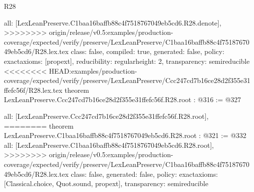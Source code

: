 \begin{lexlean}{R28}
\begin{coremodule}
{{{{{  all: [LexLeanPreserve.C1baa16baffb88c4f7518767049eb5cd6.R28.denote],
>>>>>>>> origin/release/v0.5:examples/production-coverage/expected/verify/preserve/LexLeanPreserve/C1baa16baffb88c4f7518767049eb5cd6/R28.lex.tex
  class: false,
  compiled: true,
  generated: false,
  policy: exact{axioms: [propext]},
  reducibility: regular{height: 2},
  transparency: semireducible
}
<<<<<<<< HEAD:examples/production-coverage/expected/verify/preserve/LexLeanPreserve/Ccc247cd7b16ce28d2f355e31ffefc56f/R28.lex.tex
theorem LexLeanPreserve.Ccc247cd7b16ce28d2f355e31ffefc56f.R28.root : @316 := @327 {
  all: [LexLeanPreserve.Ccc247cd7b16ce28d2f355e31ffefc56f.R28.root],
========
theorem LexLeanPreserve.C1baa16baffb88c4f7518767049eb5cd6.R28.root : @321 := @332 {
  all: [LexLeanPreserve.C1baa16baffb88c4f7518767049eb5cd6.R28.root],
>>>>>>>> origin/release/v0.5:examples/production-coverage/expected/verify/preserve/LexLeanPreserve/C1baa16baffb88c4f7518767049eb5cd6/R28.lex.tex
  class: false,
  generated: false,
  policy: exact{axioms: [Classical.choice, Quot.sound, propext]},
  transparency: semireducible
}

}}}}}
\end{coremodule}
\end{lexlean}
